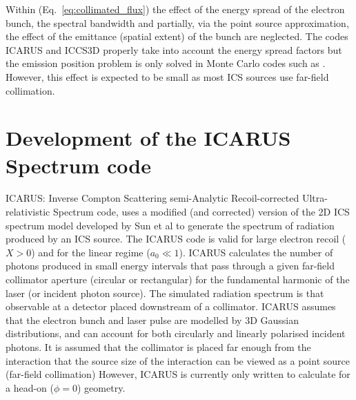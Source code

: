 \documentclass[../main.tex]{subfiles}
\begin{document}
Within (Eq.~\ref{eq:collimated_flux}) the effect of the energy spread of the electron bunch, the spectral bandwidth and partially, via the point source approximation, the effect of the emittance (spatial extent) of the bunch are neglected. The codes \textsc{ICARUS} and \textsc{ICCS3D} \cite{krafft2016laser,ranjan2018simulation} properly take into account the energy spread factors but the emission position problem is only solved in Monte Carlo codes such as  \cite{chen1995cain}. However, this effect is expected to be small as most ICS sources use far-field collimation.

\section{Development of the ICARUS Spectrum code}
\label{sec:development_of_the_ICARUS_spectrum_code}

\textsc{ICARUS}: Inverse Compton Scattering semi-Analytic Recoil-corrected Ultra-relativistic Spectrum code, uses a modified (and corrected) version of the 2D ICS spectrum model developed by Sun et al \cite{sun2009characterizations,sun2011theoretical} to generate the spectrum of radiation produced by an ICS source. The \textsc{ICARUS} code is valid for large electron recoil ($X>0$) and for the linear regime ($a_{0}\ll 1$). \textsc{ICARUS} calculates the number of photons produced in small energy intervals that pass through a given far-field collimator aperture (circular or rectangular) for the fundamental harmonic of the laser (or incident photon source). The simulated radiation spectrum is that observable at a detector placed downstream of a collimator. \textsc{ICARUS} assumes that the electron bunch and laser pulse are modelled by 3D Gaussian distributions, and can account for both circularly and linearly polarised incident photons. It is assumed that the collimator is placed far enough from the interaction that the source size of the interaction can be viewed as a point source (far-field collimation) However, \textsc{ICARUS} is currently only written to calculate for a head-on ($\phi = 0$) geometry.
\end{document}
